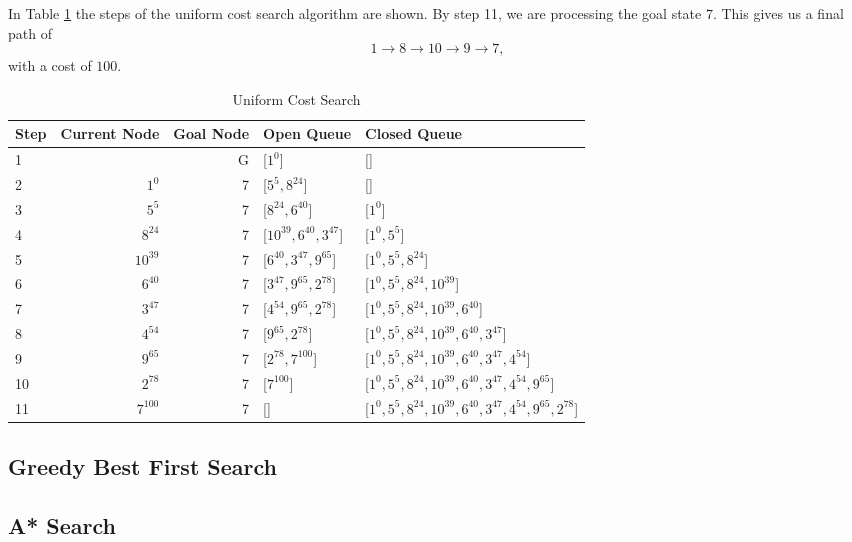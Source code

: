 \documentclass{article}
\begin{document}
    In Table \ref{tab:ucs5} the steps of the uniform cost search algorithm are shown. 
    By step 11, we are processing the goal state $7$. This gives us a final path of
    \begin{equation}
        1 \rightarrow 8 \rightarrow 10 \rightarrow 9 \rightarrow 7,
    \end{equation}
    with a cost of $100$.

    \begin{table}[!htp]\centering
        \caption{Uniform Cost Search}\label{tab:ucs5}
        \scriptsize
        \begin{tabular}{lrrll}\toprule
        Step &Current Node &Goal Node & Open Queue &Closed Queue  \\\midrule
        1&  &G &[$1^{0}$] &[] \\
        2& $1^{0}$ &7 &[$5^{5}, 8^{24}$] &[] \\
        3& $5^{5}$ &7 &[$8^{24}, 6^{40}$] &[$1^{0}$] \\
        4& $8^{24}$ &7 &[$10^{39}, 6^{40}, 3^{47} $] &[$1^{0}, 5^{5}$] \\
        5& $10^{39}$ &7 &[$6^{40}, 3^{47}, 9^{65} $] &[$1^{0}, 5^{5}, 8^{24}$] \\
        6& $6^{40}$ &7 &[$3^{47}, 9^{65}, 2^{78}$] &[$1^{0}, 5^{5}, 8^{24}, 10^{39}$] \\
        7& $3^{47}$ &7 &[$4^{54}, 9^{65}, 2^{78}$] &[$1^{0}, 5^{5}, 8^{24}, 10^{39}, 6^{40}$] \\
        8& $4^{54}$ &7 &[$9^{65}, 2^{78}$] &[$1^{0}, 5^{5}, 8^{24}, 10^{39}, 6^{40}, 3^{47}$] \\
        9& $9^{65}$ &7 &[$2^{78}, 7^{100}$] &[$1^{0}, 5^{5}, 8^{24}, 10^{39}, 6^{40}, 3^{47}, 4^{54}$] \\
        10& $2^{78}$ &7 &[$7^{100}$] &[$1^{0}, 5^{5}, 8^{24}, 10^{39}, 6^{40}, 3^{47}, 4^{54}, 9^{65}$] \\
        11& $7^{100}$ &7 &[] &[$1^{0}, 5^{5}, 8^{24}, 10^{39}, 6^{40}, 3^{47}, 4^{54}, 9^{65}, 2^{78}$] \\
        \end{tabular}
    \end{table}

\subsection{Greedy Best First Search}


\subsection{A* Search}
\end{document}
